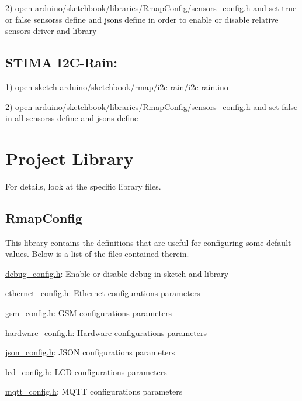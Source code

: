 2) open \hyperlink{sensors__config_8h}{arduino/sketchbook/libraries/\+Rmap\+Config/sensors\+\_\+config.\+h} and set true or false sensors\textquotesingle{}s define and json\textquotesingle{}s define in order to enable or disable relative sensor\textquotesingle{}s driver and library\hypertarget{index_i2c-rain}{}\subsection{S\+T\+I\+M\+A I2\+C-\/\+Rain\+:}\label{index_i2c-rain}
1) open sketch \hyperlink{i2c-rain_8ino}{arduino/sketchbook/rmap/i2c-\/rain/i2c-\/rain.\+ino}

2) open \hyperlink{sensors__config_8h}{arduino/sketchbook/libraries/\+Rmap\+Config/sensors\+\_\+config.\+h} and set false in all sensors\textquotesingle{}s define and json\textquotesingle{}s define\hypertarget{index_library}{}\section{Project Library}\label{index_library}
For details, look at the specific library files.\hypertarget{index_RmapConfig}{}\subsection{Rmap\+Config}\label{index_RmapConfig}
This library contains the definitions that are useful for configuring some default values. Below is a list of the files contained therein.

\hyperlink{debug__config_8h}{debug\+\_\+config.\+h}\+: Enable or disable debug in sketch and library

\hyperlink{ethernet__config_8h}{ethernet\+\_\+config.\+h}\+: Ethernet configuration\textquotesingle{}s parameters

\hyperlink{gsm__config_8h}{gsm\+\_\+config.\+h}\+: G\+SM configuration\textquotesingle{}s parameters

\hyperlink{hardware__config_8h}{hardware\+\_\+config.\+h}\+: Hardware configuration\textquotesingle{}s parameters

\hyperlink{json__config_8h}{json\+\_\+config.\+h}\+: J\+S\+ON configuration\textquotesingle{}s parameters

\hyperlink{lcd__config_8h}{lcd\+\_\+config.\+h}\+: L\+CD configuration\textquotesingle{}s parameters

\hyperlink{mqtt__config_8h}{mqtt\+\_\+config.\+h}\+: M\+Q\+TT configuration\textquotesingle{}s parameters


